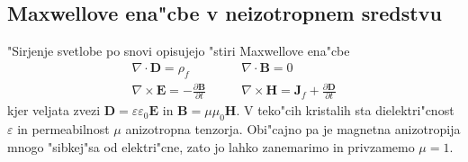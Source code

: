 \documentclass[a4paper,10pt]{article}
\newcommand{\todo}[1]{(\textbf{\textsmaller{TODO}: #1})}
\newcommand{\odvod}[2]{\frac{\partial #1}{\partial #2}}
\renewcommand{\vec}{\mathbf}
\begin{document}

\subsection{Maxwellove ena"cbe v neizotropnem sredstvu}
"Sirjenje svetlobe po snovi opisujejo "stiri Maxwellove ena"cbe
\begin{equation}
\begin{aligned}
 \nabla \cdot \vec D = \rho_f & \qquad \nabla \cdot \vec B = 0 \\
 \nabla \times \vec E = -\odvod{\vec B}{t} & \qquad \nabla \times \vec H = \vec J_f + \odvod{\vec D}{t}
\end{aligned} 
\end{equation}
kjer veljata zvezi $\vec D = \varepsilon \varepsilon_0 \vec E$ in $\vec B = \mu \mu_0 \vec H$. 
V teko"cih kristalih sta dielektri"cnost $\varepsilon$ in permeabilnost $\mu$ anizotropna tenzorja. 
Obi"cajno pa je magnetna anizotropija mnogo "sibkej"sa od elektri"cne, zato jo lahko zanemarimo in privzamemo $\mu = 1$. 
\end{document}

